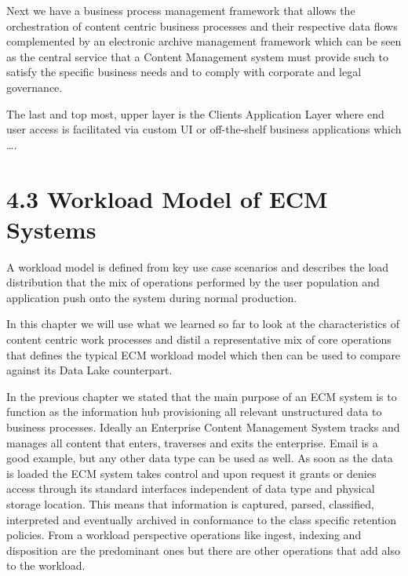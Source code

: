 Next we have a business process management framework that allows the orchestration of content centric business processes and their respective data flows complemented by an electronic archive management framework which can be seen as the central service that a Content Management system must provide such to satisfy the specific business needs and to comply with corporate and legal governance.

The last and top most, upper layer is the Clients Application Layer where end user access is facilitated via custom UI or off-the-shelf business applications which ….
\section{4.3	Workload Model of ECM Systems}
A workload model is defined from key use case scenarios and describes the load distribution that the mix of operations performed by the user population and application push onto the system during normal production.

In this chapter we will use what we learned so far to look at the characteristics of content centric work processes and distil a representative mix of core operations that defines the typical ECM workload model which then can be used to compare against its Data Lake counterpart.

In the previous chapter we stated that the main purpose of an ECM system is to function as the information hub provisioning all relevant unstructured data to business processes. Ideally an Enterprise Content Management System tracks and manages all content that enters, traverses and exits the enterprise. Email is a good example, but any other data type can be used as well. As soon as the data is loaded the ECM system takes control and upon request it grants or denies access through its standard interfaces independent of data type and physical storage location. This means that information is captured, parsed, classified, interpreted and eventually archived in conformance to the class specific retention policies. From a workload perspective operations like ingest, indexing and disposition are the predominant ones but there are other operations that add also to the workload.

